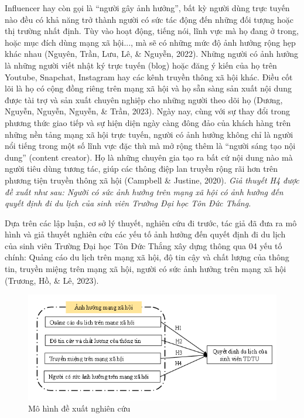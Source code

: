 \begin{enumerate}[label = \alph*)]
			Influencer hay còn gọi là “người gây ảnh hưởng”, bất kỳ người dùng trực tuyến nào đều có khả năng trở thành người có sức tác động đến những đối tượng hoặc thị trường nhất định. Tùy vào hoạt động, tiếng nói, lĩnh vực mà họ đang ở trong, hoặc mục đích dùng mạng xã hội..., mà sẽ có những mức độ ảnh hưởng rộng hẹp khác nhau (Nguyên, Trần, Lưu, Lê, \& Nguyễn, 2022). Những người có ảnh hưởng là những người viết nhật ký trực tuyến (blog) hoặc đăng ý kiến của họ trên Youtube, Snapchat, Instagram hay các kênh truyền thông xã hội khác. Điều cốt lõi là họ có cộng đồng riêng trên mạng xã hội và họ sẵn sàng sản xuất nội dung được tài trợ và sản xuất chuyên nghiệp cho những người theo dõi họ (Dương, Nguyễn, Nguyễn, Nguyễn, \& Trần, 2023). Ngày nay, cùng với sự thay đổi trong phương thức giao tiếp và sự hiện diện ngày càng đông đảo của khách hàng trên những nền tảng mạng xã hội trực tuyến, người có ảnh hưởng không chỉ là người nổi tiếng trong một số lĩnh vực đặc thù mà mở rộng thêm là “người sáng tạo nội dung” (content creator). Họ là những chuyên gia tạo ra bất cứ nội dung nào mà người tiêu dùng tương tác, giúp các thông điệp lan truyền rộng rãi hơn trên phương tiện truyền thông xã hội (Campbell \& Justine, 2020). \textit{Giả thuyết H4 được đề xuất như sau: Người có sức ảnh hưởng trên mạng xã hội có ảnh hưởng đến quyết định đi du lịch của sinh viên Trường Đại học Tôn Đức Thắng.}
			
			Dựa trên các lập luận, cơ sở lý thuyết, nghiên cứu đi trước, tác giả đã đưa ra mô hình và giả thuyết nghiên cứu các yếu tố ảnh hưởng đến quyết định đi du lịch của sinh viên Trường Đại học Tôn Đức Thắng xây dựng thông qua 04 yếu tố chính: Quảng cáo du lịch trên mạng xã hội, độ tin cậy và chất lượng của thông tin, truyền miệng trên mạng xã hội, người có sức ảnh hưởng trên mạng xã hội (Trương, Hồ, \& Lê, 2023).
			
				\begin{figure}[H]
					\includegraphics[width=\linewidth]{picture/mo_hinh_de_xuat_nghien_cuu.png}
					\caption{Mô hình đề xuất nghiên cứu}
					\label{mo_hinh_de_xuat_nghien_cuu}
					\centering
				\end{figure}
		\end{enumerate}
			
